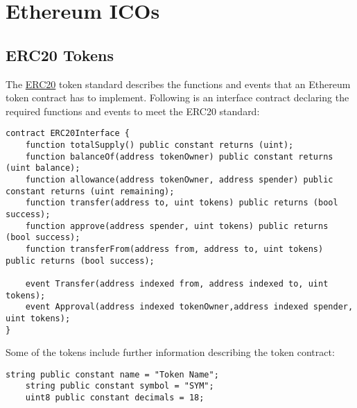 \label{Chapter4}

\chapter{Ethereum ICOs}
\section{ERC20 Tokens}
The \href{https://github.com/ethereum/EIPs/blob/master/EIPS/eip-20.md}{ERC20} token standard describes the functions and events that an Ethereum token contract has to implement. \newline
Following is an interface contract declaring the required functions and events to meet the ERC20 standard:
\begin{lstlisting}[language=Solidity]
contract ERC20Interface {
    function totalSupply() public constant returns (uint);
    function balanceOf(address tokenOwner) public constant returns (uint balance);
    function allowance(address tokenOwner, address spender) public constant returns (uint remaining);
    function transfer(address to, uint tokens) public returns (bool success);
    function approve(address spender, uint tokens) public returns (bool success);
    function transferFrom(address from, address to, uint tokens) public returns (bool success);

    event Transfer(address indexed from, address indexed to, uint tokens);
    event Approval(address indexed tokenOwner,address indexed spender, uint tokens);
}
\end{lstlisting}
Some of the tokens include further information describing the token contract:
\begin{lstlisting}[language=Solidity]
    string public constant name = "Token Name";
    string public constant symbol = "SYM";
    uint8 public constant decimals = 18;
\end{lstlisting}

